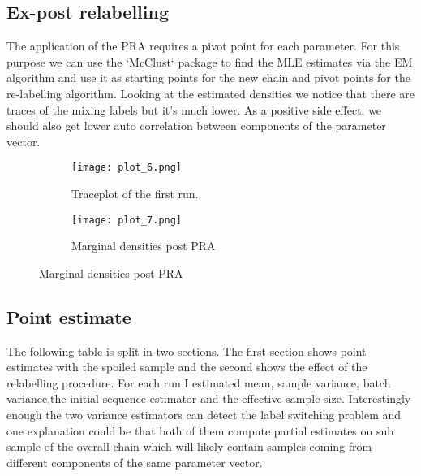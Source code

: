 \documentclass{article}
\begin{document}
\subsection{Ex-post relabelling}
The application of the PRA requires a pivot point for each parameter. For this purpose we can use the `McClust` package to find the MLE estimates via the EM algorithm and use it as starting points for the new chain and pivot points for the re-labelling algorithm. Looking at the estimated densities we notice that there are traces of the mixing labels but it's much lower. As a positive side effect, we should also get lower auto correlation between components of the parameter vector.

\begin{figure}[h!]
    \begin{subfigure}{0.5\textwidth}
        \texttt{[image: plot\_6.png]}
        \caption{Traceplot of the first run.}
        \label{Monkey measurement}
    \end{subfigure}
    \begin{subfigure}{0.5\textwidth}
        \texttt{[image: plot\_7.png]}
        \caption{Marginal densities post PRA}
        \label{Monkey measurement}
    \end{subfigure}
\end{figure}

\subsection{Point estimate}
The following table is split in two sections. The first section shows point estimates with the spoiled sample and the second shows the effect of the relabelling procedure.
For each run I estimated mean, sample variance, batch variance,the initial sequence estimator and the effective sample size. Interestingly enough the two variance estimators can detect the label switching problem and one explanation could be that both of them compute partial estimates on sub sample of the overall chain which will likely contain samples coming from different components of the same parameter vector.
\end{document}
